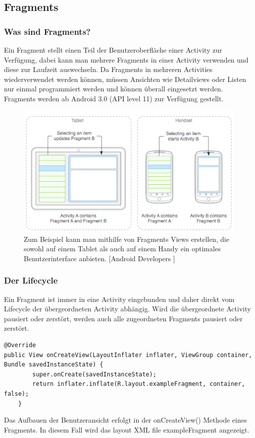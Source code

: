 \documentclass[FIPLY_base.tex]{subfiles}
\begin{document}
\subsection{Fragments}
\subsubsection{Was sind Fragments?}
Ein Fragment stellt einen Teil der Benutzeroberfläche einer Activity zur Verfügung, dabei kann man mehrere Fragments in einer Activity verwenden und diese zur Laufzeit auswechseln.
Da Fragments in mehreren Activities wiederverwendet werden können, müssen Ansichten wie Detailviews oder Listen nur einmal programmiert werden und können überall eingesetzt werden.
Fragments werden ab Android 3.0 (API level 11) zur Verfügung gestellt. 

\begin{figure}[H]
\includegraphics[scale=0.60]{img/fragments_modules}
\caption{Zum Beispiel kann man mithilfe von Fragments Views erstellen, die sowohl auf einem Tablet als auch auf einem Handy ein optimales Benutzerinterface anbieten. 
[Android Developers \cite{adFragmentsGuide}]}
\end{figure}

\newpage
\subsubsection{Der Lifecycle}
Ein Fragment ist immer in eine Activity eingebunden und daher direkt vom Lifecycle der übergeordneten Activity abhängig.
Wird die übergeordnete Activity pausiert oder zerstört, werden auch alle zugeordneten Fragments pausiert oder zerstört. %
\ \\
\begin{lstlisting}
@Override
public View onCreateView(LayoutInflater inflater, ViewGroup container, Bundle savedInstanceState) {
        super.onCreate(savedInstanceState);
        return inflater.inflate(R.layout.exampleFragment, container, false);
    }
\end{lstlisting}
Das Aufbauen der Benutzeransicht erfolgt in der onCreateView() Methode eines Fragments. In diesem Fall wird das layout XML file exampleFragment angezeigt.
\end{document}
